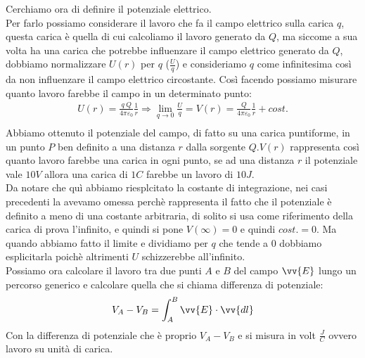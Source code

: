 \documentclass[a4paper, oneside]{article}
\begin{document}
Cerchiamo ora di definire il potenziale elettrico. \\
Per farlo possiamo considerare il lavoro che fa il campo elettrico sulla carica $q$, questa carica è quella di cui calcoliamo il lavoro generato da $Q$, ma siccome a sua volta ha una carica 
che potrebbe influenzare il campo elettrico generato da $Q$, dobbiamo normalizzare $U(r)$ per $q$ ($\frac{U}{q}$) e consideriamo $q$ come infinitesima così da non influenzare 
il campo elettrico circostante. Così facendo possiamo misurare quanto lavoro farebbe il campo in un determinato punto:
\begin{gather*}
    U(r) = \frac{q \ Q}{4 \pi \varepsilon_0} \frac{1}{r} \Rightarrow \lim_{q \to 0} \frac{U}{q} = \boxed{V(r) = \frac{Q}{4 \pi \varepsilon_0} \frac{1}{r} + cost.}\\
\end{gather*}
Abbiamo ottenuto il potenziale del campo, di fatto su una carica puntiforme, in un punto $P$ ben definito a una distanza $r$ dalla sorgente $Q$.$V(r)$ rappresenta così quanto lavoro farebbe una carica in ogni punto, se ad una distanza $r$ il potenziale vale $10 V$ allora una carica di $1 C$ farebbe un lavoro di $10 J$.\\
Da notare che quì abbiamo riesplcitato la costante di integrazione, nei casi precedenti la avevamo omessa perchè rappresenta il fatto che il potenziale è definito a meno di una costante arbitraria, di solito si usa come riferimento della carica di prova l'infinito, e quindi si pone $V(\infty) = 0$ e quindi $cost. = 0$. 
Ma quando abbiamo fatto il limite e dividiamo per $q$ che tende a 0 dobbiamo esplicitarla poichè altrimenti $U$ schizzerebbe all'infinito.\\
Possiamo ora calcolare il lavoro tra due punti $A$ e $B$ del campo $\vv{E}$ lungo un percorso generico e calcolare quella che si chiama differenza di potenziale:
\begin{gather*}
    V_A - V_B = \int_{A}^{B} \vv{E} \cdot \vv{dl}
\end{gather*}
Con la differenza di potenziale che è proprio $V_A - V_B $ e si misura in volt $\frac{J}{C}$ ovvero lavoro su unità di carica.\\
\end{document}
